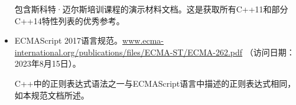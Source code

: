 \begin{itemize}
\hspace*{\fill}

包含斯科特·迈尔斯培训课程的演示材料文档。这是获取所有C++11和部分C++14特性列表的优秀参考。

\hspace*{\fill}

\item
ECMAScript 2017语言规范。\url{www.ecma-international.org/publications/files/ECMA-ST/ECMA-262.pdf} （访问日期：2023年8月15日）。

\hspace*{\fill}

C++中的正则表达式语法之一与ECMAScript语言中描述的正则表达式相同，如本规范文档所述。
\end{itemize}













